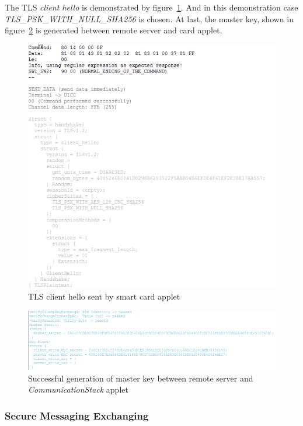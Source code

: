 The TLS \emph{client hello} is demonstrated by figure~\ref{fig:client-hello}. And in this demonstration case \emph{TLS\_PSK\_WITH\_NULL\_SHA256} is chosen. At last, the master key, shown in figure~\ref{fig:mk} is generated between remote server and card applet.

\begin{figure}[!htb]
	\centering
	\includegraphics[width=1\textwidth]{Images/impl/client-hallo.png}
		\caption{TLS client hello sent by smart card applet}
	\label{fig:client-hello}
\end{figure}

\begin{figure}[!htb]
	\centering
	\includegraphics[width=1\textwidth]{Images/impl/master-key.png}
		\caption{Successful generation of master key between remote server and \emph{CommunicationStack} applet}
	\label{fig:mk}
\end{figure}


\subsubsection{Secure Messaging Exchanging}

